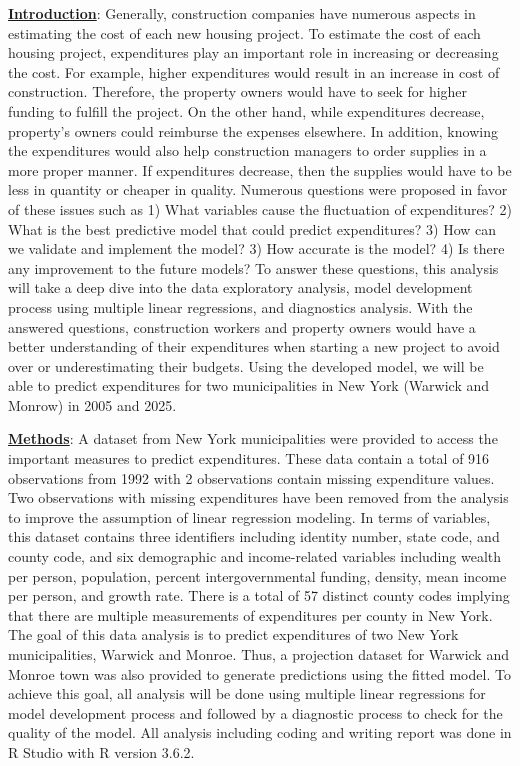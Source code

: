 \documentclass[11pt]{article}\usepackage[]{graphicx}\usepackage[]{color}
\begin{document}
\noindent\textbf{\underline{Introduction}}: Generally, construction companies have numerous aspects in estimating the cost of each new housing project. To estimate the cost of each housing project, expenditures play an important role in increasing or decreasing the cost. For example, higher expenditures would result in an increase in cost of construction. Therefore, the property owners would have to seek for higher funding to fulfill the project. On the other hand, while expenditures decrease, property’s owners could reimburse the expenses elsewhere. In addition, knowing the expenditures would also help construction managers to order supplies in a more proper manner. If expenditures decrease, then the supplies would have to be less in quantity or cheaper in quality. Numerous questions were proposed in favor of these issues such as 1) What variables cause the fluctuation of expenditures? 2) What is the best predictive model that could predict expenditures? 3) How can we validate and implement the model? 3) How accurate is the model? 4) Is there any improvement to the future models? To answer these questions, this analysis will take a deep dive into the data exploratory analysis, model development process using multiple linear regressions, and diagnostics analysis. With the answered questions, construction workers and property owners would have a better understanding of their expenditures when starting a new project to avoid over or underestimating their budgets. Using the developed model, we will be able to predict expenditures for two municipalities in New York (Warwick and Monrow) in 2005 and 2025. 
\hfill \break

\noindent\textbf{\underline{Methods}}: A dataset from New York municipalities were provided to access the important measures to predict expenditures. These data contain a total of 916 observations from 1992 with 2 observations contain missing expenditure values. Two observations with missing expenditures have been removed from the analysis to improve the assumption of linear regression modeling. In terms of variables, this dataset contains three identifiers including identity number, state code, and county code, and six demographic and income-related variables including wealth per person, population, percent intergovernmental funding, density, mean income per person, and growth rate. There is a total of 57 distinct county codes implying that there are multiple measurements of expenditures per county in New York. The goal of this data analysis is to predict expenditures of two New York municipalities, Warwick and Monroe. Thus, a projection dataset for Warwick and Monroe town was also provided to generate predictions using the fitted model. To achieve this goal, all analysis will be done using multiple linear regressions for model development process and followed by a diagnostic process to check for the quality of the model. All analysis including coding and writing report was done in R Studio with R version 3.6.2.     
\hfill \break
\end{document}
